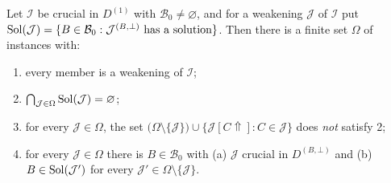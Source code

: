 \begin{longproposition}\label{constr:omega}
Let $\mathcal I$ be crucial in $D^{(1)}$ with $\mathcal B_{0}\neq\varnothing$,
and for a weakening $\mathcal J$ of $\mathcal I$ put
$\operatorname{Sol}(\mathcal J)=\{B\in\mathcal B_{0}:\mathcal J^{(B,\bot)}\text{ has a
solution}\}$. Then there is a finite set $\Omega$ of instances with:
\begin{enumerate}\tightlist
\item every member is a weakening of $\mathcal I$;
\item $\bigcap_{\mathcal J\in\Omega}\operatorname{Sol}(\mathcal J)=\varnothing$;
\item for every $\mathcal J\in\Omega$, the set
  $\bigl(\Omega\setminus\{\mathcal J\}\bigr)\cup
   \{\mathcal J[C\Uparrow]:C\in\mathcal J\}$
  does \emph{not} satisfy 2;
\item for every $\mathcal J\in\Omega$ there is $B\in\mathcal B_{0}$ with
  (a) $\mathcal J$ crucial in $D^{(B,\bot)}$ and (b) $B\in\operatorname{Sol}(\mathcal J')$
  for every $\mathcal J'\in\Omega\setminus\{\mathcal J\}$.
\end{enumerate}
\end{longproposition}

